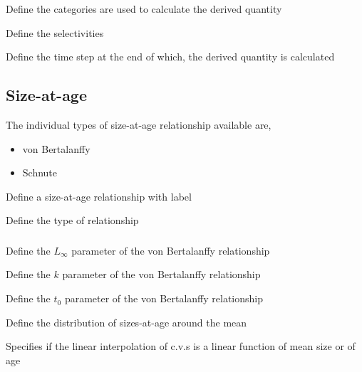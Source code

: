  {Define the categories are used to calculate the derived quantity}

 {Define the selectivities}

 {Define the time step at the end of which, the derived quantity is calculated}

\subsection{Size-at-age}

The individual types of size-at-age relationship available are, 

\begin{itemize}
	\item von Bertalanffy
	\item Schnute
\end{itemize}

 {Define a size-at-age relationship with label}

 {Define the type of relationship}

\subsubsection[von Bertalanffy]{}

 {Define the $L_\infty$ parameter of the von Bertalanffy relationship}

 {Define the $k$ parameter of the von Bertalanffy relationship}

 {Define the $t_0$ parameter of the von Bertalanffy relationship}

 {Define the distribution of sizes-at-age around the mean}

 {Specifies if the linear interpolation of c.v.s is a linear function of mean size or of age}

